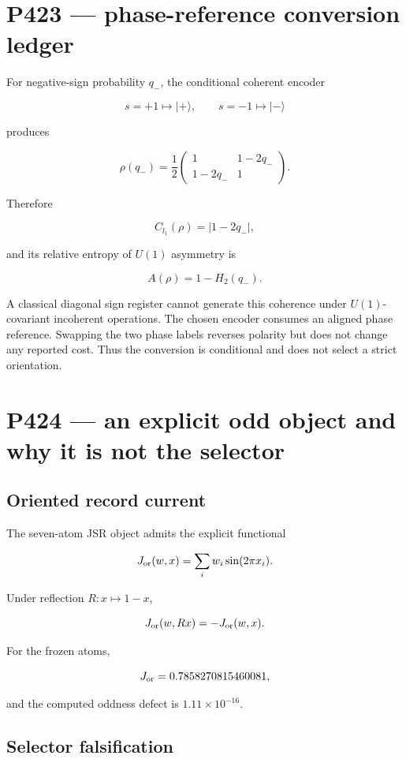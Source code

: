 \documentclass[11pt,a4paper,openany]{report}
\begin{document}
\chapter{P423 --- phase-reference conversion ledger}

For negative-sign probability \(q_-\), the conditional coherent encoder

\[
s=+1\mapsto|+\rangle,
\qquad
s=-1\mapsto|-\rangle
\]

produces

\[
\rho(q_-)=
\frac12
\begin{pmatrix}
1&1-2q_-\\
1-2q_-&1
\end{pmatrix}.
\]

Therefore

\[
C_{l_1}(\rho)=|1-2q_-|,
\]

and its relative entropy of \(U(1)\) asymmetry is

\[
A(\rho)=1-H_2(q_-).
\]

A classical diagonal sign register cannot generate this coherence under \(U(1)\)-covariant incoherent operations. The chosen encoder consumes an aligned phase reference. Swapping the two phase labels reverses polarity but does not change any reported cost. Thus the conversion is conditional and does not select a strict orientation.

\chapter{P424 --- an explicit odd object and why it is not the selector}

\section{Oriented record current}

The seven-atom JSR object admits the explicit functional

\[
J_{\rm or}(w,x)
=\sum_iw_i\sin(2\pi x_i).
\]

Under reflection \(R:x\mapsto1-x\),

\[
J_{\rm or}(w,Rx)=-J_{\rm or}(w,x).
\]

For the frozen atoms,

\[
J_{\rm or}=0.7858270815460081,
\]

and the computed oddness defect is \(1.11\times10^{-16}\).

\section{Selector falsification}
\end{document}
